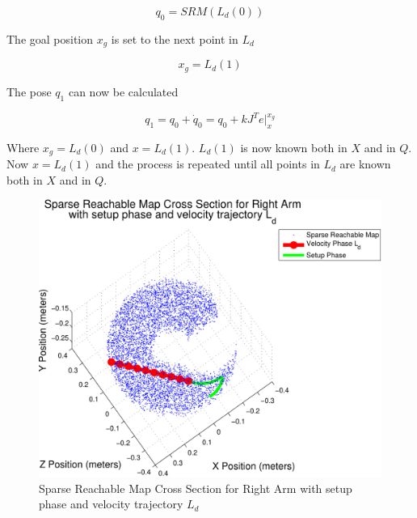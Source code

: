 \begin{equation}
q_0 = SRM  \left( L_d(0) \right)
\end{equation}

The goal position $x_g$ is set to the next point in $L_d$

\begin{equation}
x_g = L_d(1)
\end{equation}

The pose $q_1$ can now be calculated

\begin{equation}
q_1 = q_0 + \dot{q}_0 = q_0 + kJ^Te|_{x}^{x_g}
\end{equation}

Where $x_g = L_d(0)$ and $x = L_d(1)$.  $L_d(1)$ is now known both in $X$ and in $Q$.  Now $x = L_d(1)$ and the process is repeated until all points in $L_d$ are known both in $X$ and in $Q$.






\begin{figure}[thpb]
  \centering
\includegraphics[width=1.0\columnwidth]{./MATLAB/throwTraj3D.pdf}
  \caption{Sparse Reachable Map Cross Section for Right Arm with setup phase and velocity trajectory $L_d$ }
  \label{fig:3dThrowPlot1}
\end{figure}
